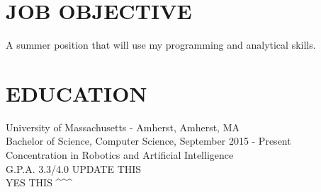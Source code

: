 \documentclass{res}
\begin{document}
 


\address{\bf  PRESENT ADDRESS\\145 Commonwealth Avenue\\Amherst, MA 01003-9253\\(908) 902-2202}
\address{\bf PERMANENT ADDRESS \\ 117 Agress Road \\  Millstone, NJ 08510 \\  (908) 902-2202}
                                  
\begin{resume}

\section{JOB OBJECTIVE}          
    A summer position that will use my programming and analytical skills.          
 
\section{EDUCATION}          
    University of Massachusetts - Amherst, Amherst, MA  \\        
    Bachelor of Science, Computer Science, September 2015 - Present   \\       
    Concentration in Robotics and Artificial Intelligence       \\
    G.P.A. 3.3/4.0          UPDATE THIS \\ 
    YES THIS \textasciicircum \textasciicircum \textasciicircum

 

\end{resume}
\end{document}
